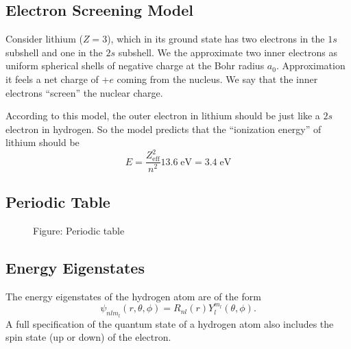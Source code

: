 \documentclass[../../../main.tex]{subfiles}
\begin{document}
\subsection{Electron Screening Model}
Consider lithium ($Z = 3$), which in its ground state has two electrons in the $1s$ subshell and one in the $2s$ subshell. We the approximate two inner electrons as uniform spherical shells of negative
charge at the Bohr radius $a_0$. Approximation it feels a net charge of +$e$ coming from the nucleus. We say that the inner electrons “screen” the nuclear charge. 

According to this model, the outer electron in lithium should be just like a $2s$ electron in hydrogen. So the model predicts that the “ionization energy” of lithium should be 
\begin{equation*}
    E=\frac{Z_{\text{eff}}^2}{n^2}13.6\;\text{eV}=3.4 \;\text{eV}
\end{equation*}

\subsection{Periodic Table}
\clearpage
\begin{figure}[h]
        \centering
        \caption*{Figure: Periodic table}
\end{figure}
\clearpage

\subsection{Energy Eigenstates}
The energy eigenstates of the hydrogen atom are of the form
\begin{equation*}
    \psi_{nlm_l} (r,\theta,\phi) = R_{nl}(r)Y^{m_l}_l (\theta,\phi).
\end{equation*}
A full specification of the quantum state of a hydrogen atom also includes the spin state (up or down) of the electron.
\end{document}
